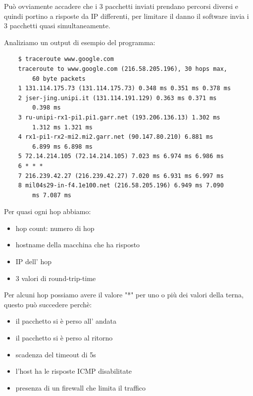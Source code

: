 Può ovviamente accadere che i 3 pacchetti inviati prendano percorsi diversi e quindi portino a risposte da IP differenti, per limitare il danno il software invia i 3 pacchetti quasi simultaneamente.

Analiziamo un output di esempio del programma:
\begin{verbatim}
    $ traceroute www.google.com
    traceroute to www.google.com (216.58.205.196), 30 hops max,
        60 byte packets
    1 131.114.175.73 (131.114.175.73) 0.348 ms 0.351 ms 0.378 ms
    2 jser-jing.unipi.it (131.114.191.129) 0.363 ms 0.371 ms
        0.398 ms
    3 ru-unipi-rx1-pi1.pi1.garr.net (193.206.136.13) 1.302 ms
        1.312 ms 1.321 ms
    4 rx1-pi1-rx2-mi2.mi2.garr.net (90.147.80.210) 6.881 ms
        6.899 ms 6.898 ms
    5 72.14.214.105 (72.14.214.105) 7.023 ms 6.974 ms 6.986 ms
    6 * * *
    7 216.239.42.27 (216.239.42.27) 7.020 ms 6.931 ms 6.997 ms
    8 mil04s29-in-f4.1e100.net (216.58.205.196) 6.949 ms 7.090
        ms 7.087 ms
\end{verbatim}
Per quasi ogni hop abbiamo:
\begin{itemize}
    \item hop count: numero di hop
    \item hostname della macchina che ha risposto
    \item IP dell' hop
    \item 3 valori di round-trip-time
\end{itemize}
Per alcuni hop possiamo avere il valore "*" per uno o più dei valori della terna, questo può succedere perchè:
\begin{itemize}
    \item il pacchetto si è perso all' andata
    \item il pacchetto si è perso al ritorno
    \item scadenza del timeout di 5s
    \item l'host ha le risposte ICMP disabilitate
    \item presenza di un firewall che limita il traffico
\end{itemize}



